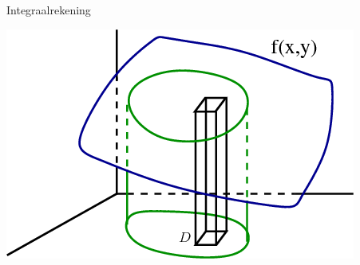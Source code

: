 \documentclass[a4paper,12pt]{article}
\begin{document}
\pagestyle{fancy}
\lhead{}

\begin{theorie}

\thispagestyle{empty}
\begin{center}
  \begin{mdframed}
  \centering
  \fontsize{40}{50}\selectfont Integraalrekening
  \end{mdframed}
  \vfill
  \includegraphics[width=.5\textwidth]{double_integral_volume_under_surface_box}
  \vfill
\end{center}

{
\small
\singlespacing
}
\end{theorie}
\end{document}
